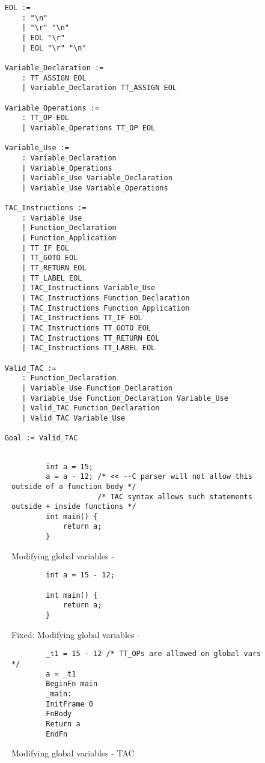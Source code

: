 \begin{verbatim}
	EOL :=
	    : "\n"
	    | "\r" "\n"
	    | EOL "\r"
	    | EOL "\r" "\n"
	
	Variable_Declaration := 
	    : TT_ASSIGN EOL
	    | Variable_Declaration TT_ASSIGN EOL
	
	Variable_Operations :=
	    : TT_OP EOL
	    | Variable_Operations TT_OP EOL
		
	Variable_Use :=
	    : Variable_Declaration
	    | Variable_Operations
	    | Variable_Use Variable_Declaration
	    | Variable_Use Variable_Operations
	
	TAC_Instructions :=
	    : Variable_Use
	    | Function_Declaration
	    | Function_Application
	    | TT_IF EOL
	    | TT_GOTO EOL
	    | TT_RETURN EOL
	    | TT_LABEL EOL
	    | TAC_Instructions Variable_Use
	    | TAC_Instructions Function_Declaration
	    | TAC_Instructions Function_Application
	    | TAC_Instructions TT_IF EOL
	    | TAC_Instructions TT_GOTO EOL
	    | TAC_Instructions TT_RETURN EOL
	    | TAC_Instructions TT_LABEL EOL
	
	Valid_TAC :=
	    : Function_Declaration
	    | Variable_Use Function_Declaration
	    | Variable_Use Function_Declaration Variable_Use
	    | Valid_TAC Function_Declaration
	    | Valid_TAC Variable_Use

	Goal := Valid_TAC
	
\end{verbatim}

\begin{figure}[p]
	\begin{verbatim}
		int a = 15;
		a = a - 12; /* << --C parser will not allow this outside of a function body */
		            /* TAC syntax allows such statements outside + inside functions */
		int main() {
			return a;
		}
	\end{verbatim}
	\caption{Modifying global variables - \mmc}
	\label{fig:parsefail}
\end{figure}

\begin{figure}[p]
	\begin{verbatim}
		int a = 15 - 12;

		int main() {
			return a;
		}
	\end{verbatim}
	\caption{Fixed: Modifying global variables - \mmc}
	\label{fig:parsefix}
\end{figure}

\begin{figure}[p]
	\begin{verbatim}
		_t1 = 15 - 12 /* TT_OPs are allowed on global vars */
		a = _t1
		BeginFn main
		_main:
		InitFrame 0
		FnBody
		Return a
		EndFn
	\end{verbatim}
	\caption{Modifying global variables - TAC}
	\label{fig:parsefailtac}
\end{figure}

